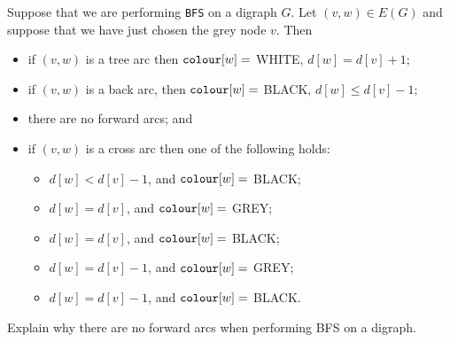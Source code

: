 \begin{Theorem} \label{thm:BFS-arcclass}
Suppose that we are performing \texttt{BFS} on a digraph $G$. Let $(v,
w)\in E(G)$ and suppose that we have just chosen the grey node $v$. 
Then
\begin{itemize}
  \item if $(v, w)$ is a tree arc then $\operatorname{\text{\texttt{colour}}}[w] = $ WHITE, $d[w] = d[v] + 1$;
  \item if $(v, w)$ is a back arc, then $\operatorname{\text{\texttt{colour}}}[w] = $ BLACK, $d[w] \leq d[v] - 1$;  
  \item there are no forward arcs; and
  \item if $(v, w)$ is a cross arc then one of the following holds:
  \begin{itemize}
	\item $d[w] < d[v] - 1$, and $\operatorname{\text{\texttt{colour}}}[w] = $ BLACK;
	\item $d[w] = d[v]$, and $\operatorname{\text{\texttt{colour}}}[w] = $ GREY;
	\item $d[w] = d[v]$, and $\operatorname{\text{\texttt{colour}}}[w] = $ BLACK;
	\item $d[w] = d[v] - 1$, and $\operatorname{\text{\texttt{colour}}}[w] = $ GREY;
	\item $d[w] = d[v] - 1$, and $\operatorname{\text{\texttt{colour}}}[w] = $ BLACK.
  \end{itemize}
\end{itemize}
\end{Theorem}

\begin{Boxample}[6]
Explain why there are no forward arcs when performing BFS on a digraph.
\end{Boxample}

%
%

